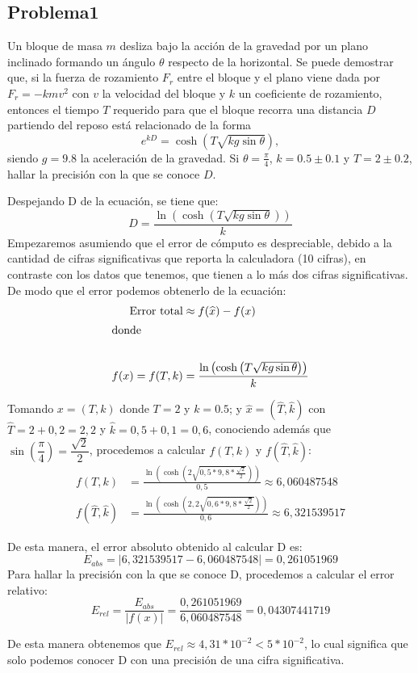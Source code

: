 \documentclass[12pt, a4paper]{article}%
\begin{document}
\subsection*{Problema1}
Un bloque de masa \( m \) desliza bajo la acción de la gravedad por un plano inclinado formando un ángulo \( \theta \) respecto de la horizontal. Se puede demostrar que, si la fuerza de rozamiento \( F_r \) entre el bloque y el plano viene dada por \( F_r = -k m v^2 \) con \( v \) la velocidad del bloque y \( k \) un coeficiente de rozamiento, entonces el tiempo \( T \) requerido para que el bloque recorra una distancia \( D \) partiendo del reposo está relacionado de la forma
\[
e^{kD} = \cosh\left(T \sqrt{k g \sin \theta}\right),
\]
siendo \( g = 9.8 \) la aceleración de la gravedad. Si \( \theta = \frac{\pi}{4} \), \( k = 0.5 \pm 0.1 \) y \( T = 2 \pm 0.2 \), hallar la precisión con la que se conoce \( D \).
\begin{solution}
    Despejando D de la ecuación, se tiene que:
    \[ D=\frac{\ln{\left(\cosh{\left(T\sqrt{kg\sin{\theta}}\right)}\right)}}{k}
    \]
    Empezaremos asumiendo que el error de cómputo es despreciable, debido a la cantidad de cifras significativas que reporta la calculadora (10 cifras), en contraste con los datos que tenemos, que tienen a lo más dos cifras significativas. De modo que el error podemos obtenerlo de la ecuación:
    \begin{align*}
    \text{Error total}&\approx f(\widehat{x})-f(x)\\
    \intertext{donde}\\ f(x)=f(T,k)&=\frac{\ln{\left(\cosh{\left(T\sqrt{kg\sin{\theta}}\right)}\right)}}{k}
    \end{align*}
    
    Tomando $x=(T,k)$ donde $T=2$ y $k=0.5$; y $\widehat{x}=(\widehat{T},\widehat{k})$ con $\widehat{T}=2+0,2=2,2$ y $\widehat{k}=0,5+0,1=0,6$, conociendo además que $\sin\left(\dfrac{\pi}{4}\right)=\dfrac{\sqrt{2}}
    {2}$, procedemos a calcular $f(T,k)$ y $f(\widehat{T},\widehat{k})$:
    \begin{align*}
        f(T,k)&=\frac{\ln{\left(\cosh{\left(2\sqrt{0,5*9,8*\frac{\sqrt{2}}{2}}\right)}\right)}}{0,5}\approx 6,060487548\\
        f(\widehat{T},\widehat{k})&=\frac{\ln{\left(\cosh{\left(2,2\sqrt{0,6*9,8*\frac{\sqrt{2}}{2}}\right)}\right)}}{0,6}\approx 6,321539517
    \end{align*}

    De esta manera, el error absoluto obtenido al calcular D es:
    \[
    E_{abs}=|6,321539517-6,060487548|=0,261051969
    \] Para hallar la precisión con la que se conoce D, procedemos a calcular el error relativo:
    \[
    E_{rel}=\dfrac{E_{abs}}{|f(x)|}=\dfrac{0,261051969}{6,060487548}=0,04307441719
    \]
    
    De esta manera obtenemos que $E_{rel}\approx 4,31*10^{-2}<5*10^{-2}$, lo cual significa que solo podemos conocer D con una precisión de una cifra significativa.

    \end{solution}
\end{document}
